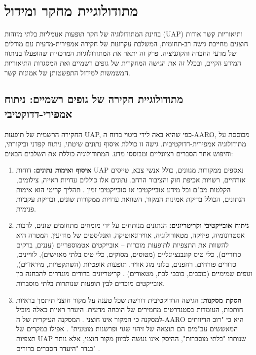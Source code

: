 \documentclass[12pt,a4paper]{article}
\begin{document}
\section{מתודולוגיית מחקר ומידול}
בחינת המתודולוגיה של חקר תופעות אנומליות בלתי מזוהות (UAP) ותיאוריות קשר אודות חוצנים מחייבת גישה רב-תחומית, המשלבת עקרונות של חקירה אמפירית-מדעית עם מודלים של מדעי החברה והקוגניציה. פרק זה יתאר את המתודולוגיות המרכזיות שהופעלו בניתוח המידע הקיים, ובכלל זה את הגישה המחקרית של גופים רשמיים ואת המסגרות התיאוריות המשמשות למידול התפשטותן של אמונות קשר.

\subsection{מתודולוגיית חקירה של גופים רשמיים: ניתוח אמפירי-דדוקטיבי}
החקירה הרשמית של תופעות UAP, כפי שהיא באה לידי ביטוי בדוח ה-AARO, מבוססת על מתודולוגיה אמפירית-דדוקטיבית. גישה זו כוללת איסוף נתונים שיטתי, ניתוח קפדני וביקורתי, וחיפוש אחר הסברים רציונליים ומבוססי מדע. המתודולוגיה כוללת את השלבים הבאים:

\begin{enumerate}
    \item \textbf{איסוף ואימות נתונים:} דוחות UAP נאספים ממקורות מגוונים, כולל אנשי צבא, טייסים אזרחיים, רשויות אכיפת חוק והציבור הרחב. נתונים אלו כוללים עדויות ראייה, צילומים, הקלטות מכ"ם וכל מידע אובייקטיבי או סובייקטיבי זמין \cite[p. 1, 2]{s41599-025-04799-8}. תהליך קריטי הוא אימות הנתונים, הכולל בדיקת אמינות המקור, השוואת עדויות ממקורות שונים, ובדיקת עקביות פנימית.
    \item \textbf{ניתוח אובייקטיבי וקריטריונים:} הנתונים מנותחים על ידי מומחים מתחומים שונים, לרבות אסטרונומיה, פיזיקה, מטאורולוגיה, אווירונאוטיקה, ואנליסטים של מודיעין. המטרה היא להשוות את התצפיות לתופעות מוכרות – אובייקטים אטמוספריים (עננים, ברקים כדוריים), כלי טיס קונבנציונליים (מטוסים, מסוקים, כלי טיס בלתי מאוישים), לוויינים, כדורים פורחים, רחפנים, בלוני מזג אוויר, תופעות אופטיות (השתקפויות, מיראז'ים), וגופים שמימיים (כוכבים, כוכבי לכת, מטאורים) \cite[p. 1]{s41599-025-04799-8}. קריטריונים ברורים מוגדרים להבחנה בין אובייקטים מוכרים לבין תופעות שנותרות בלתי מוסברות.
    \item \textbf{הסקת מסקנות:} הגישה הדדוקטיבית דורשת שכל טענה על מקור חוצני תיתמך בראיות חותכות, העומדות בסטנדרטים מחמירים של הוכחה מדעית. היעדר ראיות כאלה מוביל למסקנה כי המקור אינו חוצני \cite[p. 1, 2]{s41599-025-04799-8}. המסקנה העיקרית של ה-AARO היא כי "רוב הדיווחים המאששים עב"מים הם תוצאה של זיהוי שגוי ופרשנות מוטעית" \cite[p. 1]{s41599-025-04799-8}. אפילו במקרים של תצפיות UAP שנותרו "בלתי מוסברות", ההיסק אינו נעשה לכיוון מקור חוצני, אלא נותר בגדר "היעדר הסברים ברורים" \cite[p. 1]{s41599-025-04799-8}.
\end{enumerate}
\end{document}
